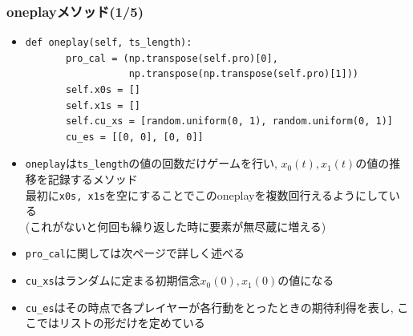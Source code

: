 \documentclass[dvipdfmx,fleqn,handout]{beamer}
\begin{document}
\begin{frame}[fragile]%
\frametitle{oneplayメソッド(1/5)}
\begin{itemize}\setlength{\parskip}{0.5em}
\item

\footnotesize
\begin{verbatim}
def oneplay(self, ts_length):
       pro_cal = (np.transpose(self.pro)[0],
                  np.transpose(np.transpose(self.pro)[1]))
       self.x0s = []
       self.x1s = []
       self.cu_xs = [random.uniform(0, 1), random.uniform(0, 1)]
       cu_es = [[0, 0], [0, 0]]
 \end{verbatim}\pause
\normalsize

\item
\verb|oneplay|は\verb|ts_length|の値の回数だけゲームを行い, $x_0(t),x_1(t)$の値の推移を記録するメソッド\pause\\
最初に\verb|x0s, x1s|を空にすることでこのoneplayを複数回行えるようにしている\\
(これがないと何回も繰り返した時に要素が無尽蔵に増える)\pause
\item
\verb|pro_cal|に関しては次ページで詳しく述べる
\item
\verb|cu_xs|はランダムに定まる初期信念$x_0(0),x_1(0)$の値になる\pause
\item
\verb|cu_es|はその時点で各プレイヤーが各行動をとったときの期待利得を表し, ここではリストの形だけを定めている
\end{itemize}
\end{frame}
\end{document}

